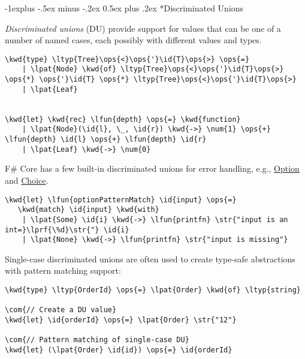 \documentclass[10pt,landscape]{article}
\makeatletter
\renewcommand{\subsection}{\@startsection{subsection}{2}{0mm}%
                                {-1explus -.5ex minus -.2ex}%
                                {0.5ex plus .2ex}%
                                {\normalfont\normalsize\bfseries}}
\newcommand{\id}[1]{\textcolor[HTML]{000000}{#1}}
\newcommand{\str}[1]{\textcolor[HTML]{A31515}{#1}}
\newcommand{\kwd}[1]{\textcolor[HTML]{0000FF}{#1}}
\newcommand{\com}[1]{\textcolor[HTML]{008000}{#1}}
\newcommand{\ops}[1]{\textcolor[HTML]{000000}{#1}}
\newcommand{\num}[1]{\textcolor[HTML]{000000}{#1}}
\newcommand{\ltyp}[1]{\textcolor[HTML]{2B91AF}{#1}}
\newcommand{\lfun}[1]{\textcolor[HTML]{0000A0}{#1}}
\newcommand{\lpat}[1]{\textcolor[HTML]{800080}{#1}}
\newcommand{\lprf}[1]{\textcolor[HTML]{2B91AF}{#1}}
\makeatother
\begin{document}
\begin{multicols}{3}
\begin{Verbatim}[commandchars=\\\{\}]
\end{Verbatim}

\subsection*{Discriminated Unions}



\emph{Discriminated unions} (DU) provide support for values that can be one of a number of named cases, each possibly with different values and types.
\begin{Verbatim}[commandchars=\\\{\}]
\kwd{type} \ltyp{Tree}\ops{<}\ops{'}\id{T}\ops{>} \ops{=}
    | \lpat{Node} \kwd{of} \ltyp{Tree}\ops{<}\ops{'}\id{T}\ops{>} \ops{*} \ops{'}\id{T} \ops{*} \ltyp{Tree}\ops{<}\ops{'}\id{T}\ops{>}
    | \lpat{Leaf}


\kwd{let} \kwd{rec} \lfun{depth} \ops{=} \kwd{function}
    | \lpat{Node}(\id{l}, \_, \id{r}) \kwd{->} \num{1} \ops{+} \lfun{depth} \id{l} \ops{+} \lfun{depth} \id{r}
    | \lpat{Leaf} \kwd{->} \num{0}

\end{Verbatim}



F\# Core has a few built-in discriminated unions for error handling, e.g., \href{http://msdn.microsoft.com/en-us/library/dd233245.aspx}{Option} and \href{http://msdn.microsoft.com/en-us/library/ee353439.aspx}{Choice}.
\begin{Verbatim}[commandchars=\\\{\}]
\kwd{let} \lfun{optionPatternMatch} \id{input} \ops{=}
   \kwd{match} \id{input} \kwd{with}
    | \lpat{Some} \id{i} \kwd{->} \lfun{printfn} \str{"input is an int=}\lprf{\%d}\str{"} \id{i}
    | \lpat{None} \kwd{->} \lfun{printfn} \str{"input is missing"}

\end{Verbatim}



Single-case discriminated unions are often used to create type-safe abstractions with pattern matching support:
\begin{Verbatim}[commandchars=\\\{\}]
\kwd{type} \ltyp{OrderId} \ops{=} \lpat{Order} \kwd{of} \ltyp{string}

\com{// Create a DU value}
\kwd{let} \id{orderId} \ops{=} \lpat{Order} \str{"12"}

\com{// Pattern matching of single-case DU}
\kwd{let} (\lpat{Order} \id{id}) \ops{=} \id{orderId}


\end{Verbatim}
\end{multicols}
\end{document}

